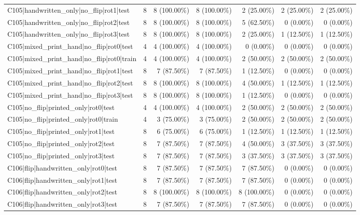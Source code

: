 \begin{longtable}{>{\raggedright\arraybackslash}p{5cm}rrrrrr}
C105|handwritten\_only|no\_flip|rot1|test & 8 & 8 (100.00\%) & 8 (100.00\%) & 2 (25.00\%) & 2 (25.00\%) & 2 (25.00\%) \\
C105|handwritten\_only|no\_flip|rot2|test & 8 & 8 (100.00\%) & 8 (100.00\%) & 5 (62.50\%) & 0 (0.00\%) & 0 (0.00\%) \\
C105|handwritten\_only|no\_flip|rot3|test & 8 & 8 (100.00\%) & 8 (100.00\%) & 2 (25.00\%) & 1 (12.50\%) & 1 (12.50\%) \\
C105|mixed\_print\_hand|no\_flip|rot0|test & 4 & 4 (100.00\%) & 4 (100.00\%) & 0 (0.00\%) & 0 (0.00\%) & 0 (0.00\%) \\
C105|mixed\_print\_hand|no\_flip|rot0|train & 4 & 4 (100.00\%) & 4 (100.00\%) & 2 (50.00\%) & 2 (50.00\%) & 2 (50.00\%) \\
C105|mixed\_print\_hand|no\_flip|rot1|test & 8 & 7 (87.50\%) & 7 (87.50\%) & 1 (12.50\%) & 0 (0.00\%) & 0 (0.00\%) \\
C105|mixed\_print\_hand|no\_flip|rot2|test & 8 & 8 (100.00\%) & 8 (100.00\%) & 4 (50.00\%) & 1 (12.50\%) & 1 (12.50\%) \\
C105|mixed\_print\_hand|no\_flip|rot3|test & 8 & 8 (100.00\%) & 8 (100.00\%) & 1 (12.50\%) & 0 (0.00\%) & 0 (0.00\%) \\
C105|no\_flip|printed\_only|rot0|test & 4 & 4 (100.00\%) & 4 (100.00\%) & 2 (50.00\%) & 2 (50.00\%) & 2 (50.00\%) \\
C105|no\_flip|printed\_only|rot0|train & 4 & 3 (75.00\%) & 3 (75.00\%) & 2 (50.00\%) & 2 (50.00\%) & 2 (50.00\%) \\
C105|no\_flip|printed\_only|rot1|test & 8 & 6 (75.00\%) & 6 (75.00\%) & 1 (12.50\%) & 1 (12.50\%) & 1 (12.50\%) \\
C105|no\_flip|printed\_only|rot2|test & 8 & 7 (87.50\%) & 7 (87.50\%) & 4 (50.00\%) & 3 (37.50\%) & 3 (37.50\%) \\
C105|no\_flip|printed\_only|rot3|test & 8 & 7 (87.50\%) & 7 (87.50\%) & 3 (37.50\%) & 3 (37.50\%) & 3 (37.50\%) \\
C106|flip|handwritten\_only|rot0|test & 8 & 7 (87.50\%) & 7 (87.50\%) & 7 (87.50\%) & 0 (0.00\%) & 0 (0.00\%) \\
C106|flip|handwritten\_only|rot1|test & 8 & 7 (87.50\%) & 7 (87.50\%) & 7 (87.50\%) & 0 (0.00\%) & 0 (0.00\%) \\
C106|flip|handwritten\_only|rot2|test & 8 & 8 (100.00\%) & 8 (100.00\%) & 8 (100.00\%) & 0 (0.00\%) & 0 (0.00\%) \\
C106|flip|handwritten\_only|rot3|test & 8 & 7 (87.50\%) & 7 (87.50\%) & 7 (87.50\%) & 0 (0.00\%) & 0 (0.00\%) \\

\end{longtable}
